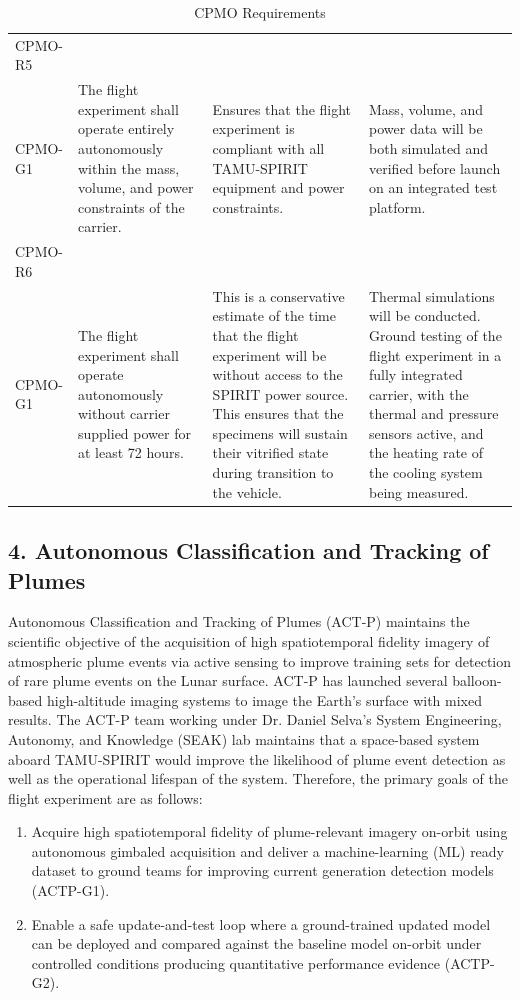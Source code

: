 \documentclass[conf]{new-aiaa}
\begin{document}
\begin{table}[H]
\begin{tabularx}{\textwidth}{@{}>{\raggedright\arraybackslash}m{2.4cm}YYY@{}}
    CPMO-R5\\CPMO-G1 &
    The flight experiment shall operate entirely autonomously within the mass, volume, and power constraints of the carrier. &
    Ensures that the flight experiment is compliant with all TAMU-SPIRIT equipment and power constraints. &
    Mass, volume, and power data will be both simulated and verified before launch on an integrated test platform. \\ \hline

    CPMO-R6\\CPMO-G1 &
    The flight experiment shall operate autonomously without carrier supplied power for at least 72 hours. &
    This is a conservative estimate of the time that the flight experiment will be without access to the SPIRIT power source. This ensures that the specimens will sustain their vitrified state during transition to the vehicle. &
    Thermal simulations will be conducted. Ground testing of the flight experiment in a fully integrated carrier, with the thermal and pressure sensors active, and the heating rate of the cooling system being measured. \\
    \bottomrule
    \end{tabularx}
    \caption{CPMO Requirements}
    \label{tab:cpmo_requirements}
\end{table}


\clearpage
\subsection{4. Autonomous Classification and Tracking of Plumes}

Autonomous Classification and Tracking of Plumes (ACT-P) maintains the scientific objective of the acquisition of high spatiotemporal fidelity imagery of atmospheric plume events via active sensing to improve training sets for detection of rare plume events on the Lunar surface. ACT-P has launched several balloon-based high-altitude imaging systems to image the Earth's surface with mixed results. The ACT-P team working under Dr. Daniel Selva's System Engineering, Autonomy, and Knowledge (SEAK) lab maintains that a space-based system aboard TAMU-SPIRIT would improve the likelihood of plume event detection as well as the operational lifespan of the system. Therefore, the primary goals of the flight experiment are as follows: \cite{selva-actp}

\vspace{0.3em}
\begin{enumerate}[leftmargin=*]
    \item Acquire high spatiotemporal fidelity of plume-relevant imagery on-orbit using autonomous gimbaled acquisition and deliver a machine-learning (ML) ready dataset to ground teams for improving current generation detection models (ACTP-G1).
    \item Enable a safe update-and-test loop where a ground-trained updated model can be deployed and compared against the baseline model on-orbit under controlled conditions producing quantitative performance evidence (ACTP-G2).
\end{enumerate}
\end{document}
